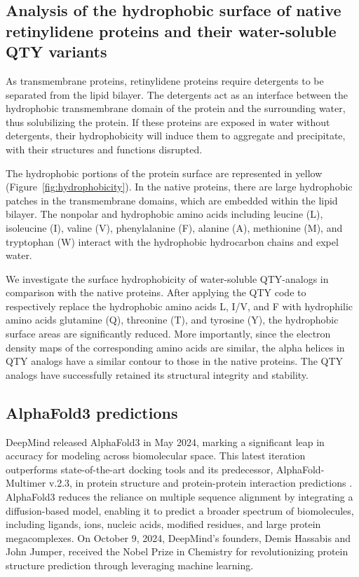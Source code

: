 \documentclass[fleqn, 10pt, lineno]{manuscript}
\begin{document}
\subsection*{Analysis of the hydrophobic surface of native retinylidene proteins and their water-soluble QTY variants}

As transmembrane proteins, retinylidene proteins require detergents to be separated from the lipid bilayer. The detergents act as an interface between the hydrophobic transmembrane domain of the protein and the surrounding water, thus solubilizing the protein. If these proteins are exposed in water without detergents, their hydrophobicity will induce them to aggregate and precipitate, with their structures and functions disrupted. 

The hydrophobic portions of the protein surface are represented in yellow (Figure~\ref{fig:hydrophobicity}). In the native proteins, there are large hydrophobic patches in the transmembrane domains, which are embedded within the lipid bilayer. The nonpolar and hydrophobic amino acids including leucine (L), isoleucine (I), valine (V), phenylalanine (F), alanine (A), methionine (M), and tryptophan (W) interact with the hydrophobic hydrocarbon chains and expel water. 

We investigate the surface hydrophobicity of water-soluble QTY-analogs in comparison with the native proteins. After applying the QTY code to respectively replace the hydrophobic amino acids L, I/V, and F with hydrophilic amino acids glutamine (Q), threonine (T), and tyrosine (Y), the hydrophobic surface areas are significantly reduced. More importantly, since the electron density maps of the corresponding amino acids are similar, the alpha helices in QTY analogs have a similar contour to those in the native proteins. The QTY analogs have successfully retained its structural integrity and stability. 

\subsection*{AlphaFold3 predictions}

DeepMind released AlphaFold3 in May 2024, marking a significant leap in accuracy for modeling across biomolecular space. This latest iteration outperforms state-of-the-art docking tools and its predecessor, AlphaFold-Multimer v.2.3, in protein structure and protein-protein interaction predictions \citep{Abramson_2024}. AlphaFold3 reduces the reliance on multiple sequence alignment by integrating a diffusion-based model, enabling it to predict a broader spectrum of biomolecules, including ligands, ions, nucleic acids, modified residues, and large protein megacomplexes. On October 9, 2024, DeepMind’s founders, Demis Hassabis and John Jumper, received the Nobel Prize in Chemistry for revolutionizing protein structure prediction through leveraging machine learning. 
\end{document}
